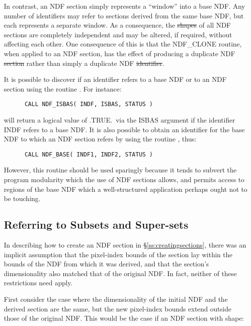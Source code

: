 In contrast, an NDF section simply represents a ``window'' into a base NDF. 
Any number of identifiers may refer to sections derived from the same base
NDF, but each represents a separate window.
As a consequence, the \st{shapes\/} of all NDF sections are completely
independent and may be altered, if required, without affecting each other. 
One consequence of this is that the NDF\_CLONE routine, when applied to an
NDF section, has the effect of producing a duplicate NDF \st{section\/}
rather than simply a duplicate NDF \st{identifier}. 

It is possible to discover if an identifier refers to a base NDF or to an
NDF section using the routine . 
For instance:

\small
\begin{verbatim}
      CALL NDF_ISBAS( INDF, ISBAS, STATUS )
\end{verbatim}
\normalsize

will return a logical value of .TRUE.\ via the ISBAS argument if the
identifier INDF refers to a base NDF. 
It is also possible to obtain an identifier for the base NDF to which an NDF
section refers by using the routine , thus: 

\small
\begin{verbatim}
      CALL NDF_BASE( INDF1, INDF2, STATUS )
\end{verbatim}
\normalsize

However, this routine should be used sparingly because it tends to subvert
the program modularity which the use of NDF sections allows, and permits
access to regions of the base NDF which a well-structured application perhaps
ought not to be touching. 

\subsection{\label{ss:selectingsupersets}Referring to Subsets and Super-sets}

In describing how to create an NDF section in \S\ref{ss:creatingsections},
there was an implicit assumption that the pixel-index bounds of the section
lay within the bounds of the NDF from which it was derived, and that the
section's dimensionality also matched that of the original NDF. 
In fact, neither of these restrictions need apply.

First consider the case where the dimensionality of the initial NDF and the
derived section are the same, but the new pixel-index bounds extend outside
those of the original NDF.
This would be the case if an NDF section with shape:

